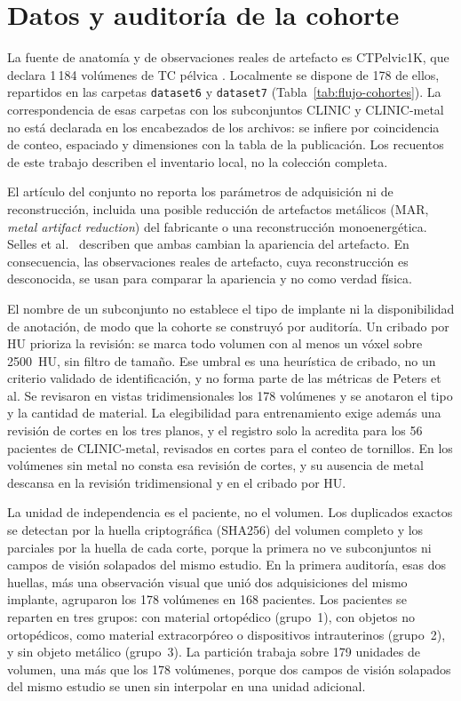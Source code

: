 \section{Datos y auditoría de la cohorte}\label{sec:datos}

La fuente de anatomía y de observaciones reales de artefacto es CTPelvic1K, que declara 1\,184 volúmenes de TC pélvica \cite{liu2021ctpelvic1k}. Localmente se dispone de 178 de ellos, repartidos en las carpetas \texttt{dataset6} y \texttt{dataset7} (Tabla~\ref{tab:flujo-cohortes}). La correspondencia de esas carpetas con los subconjuntos CLINIC y CLINIC-metal no está declarada en los encabezados de los archivos: se infiere por coincidencia de conteo, espaciado y dimensiones con la tabla de la publicación. Los recuentos de este trabajo describen el inventario local, no la colección completa.

El artículo del conjunto no reporta los parámetros de adquisición ni de reconstrucción, incluida una posible reducción de artefactos metálicos (MAR, \emph{metal artifact reduction}) del fabricante o una reconstrucción monoenergética. Selles et al.~\cite{selles2024marreview} describen que ambas cambian la apariencia del artefacto. En consecuencia, las observaciones reales de artefacto, cuya reconstrucción es desconocida, se usan para comparar la apariencia y no como verdad física.

El nombre de un subconjunto no establece el tipo de implante ni la disponibilidad de anotación, de modo que la cohorte se construyó por auditoría. Un cribado por HU prioriza la revisión: se marca todo volumen con al menos un vóxel sobre 2500~HU, sin filtro de tamaño. Ese umbral es una heurística de cribado, no un criterio validado de identificación, y no forma parte de las métricas de Peters et al. Se revisaron en vistas tridimensionales los 178 volúmenes y se anotaron el tipo y la cantidad de material. La elegibilidad para entrenamiento exige además una revisión de cortes en los tres planos, y el registro solo la acredita para los 56 pacientes de CLINIC-metal, revisados en cortes para el conteo de tornillos. En los volúmenes sin metal no consta esa revisión de cortes, y su ausencia de metal descansa en la revisión tridimensional y en el cribado por HU.

La unidad de independencia es el paciente, no el volumen. Los duplicados exactos se detectan por la huella criptográfica (SHA256) del volumen completo y los parciales por la huella de cada corte, porque la primera no ve subconjuntos ni campos de visión solapados del mismo estudio. En la primera auditoría, esas dos huellas, más una observación visual que unió dos adquisiciones del mismo implante, agruparon los 178 volúmenes en 168 pacientes. Los pacientes se reparten en tres grupos: con material ortopédico (grupo~1), con objetos no ortopédicos, como material extracorpóreo o dispositivos intrauterinos (grupo~2), y sin objeto metálico (grupo~3). La partición trabaja sobre 179 unidades de volumen, una más que los 178 volúmenes, porque dos campos de visión solapados del mismo estudio se unen sin interpolar en una unidad adicional.

